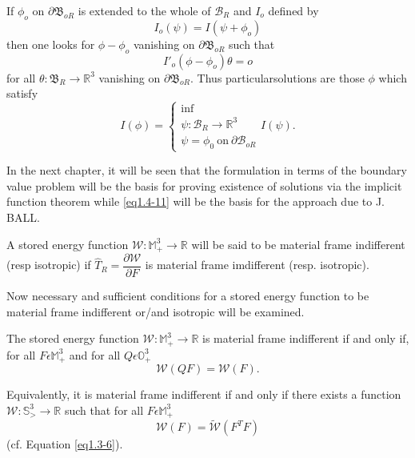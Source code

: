 If $\phi _o$ on $ \partial \mathfrak{B}_{oR} $ is extended to the
whole of $\mathcal {B}_R$ and $I_o$ defined by  
$$
I _o ( \psi ) = I ( \psi + \phi _o)
$$
then one looks for $\phi- \phi _o $ vanishing on $ \partial
\mathfrak{B}_{oR}$ such that  
$$
I'_o (\phi - \phi _o ) \theta =o
$$
for all $\theta : \mathfrak{B}_{R} \to \mathbb{R}^3$ vanishing on
$\partial \mathfrak{B} _{oR}$. Thus
particular\pageoriginale solutions are those $\phi$ which satisfy 
\begin{equation*}
  I (\phi )=
  \begin{cases}
    \inf\\
    \psi :\mathscr{B}_{R} \to \mathbb{R}^{3}\\
    \psi = \phi_{0} ~\text{on}~ \partial \mathscr{B}_{oR}
  \end{cases} I(\psi).
   \tag{1.4-11}\label{eq1.4-11}
\end{equation*}

In the next chapter, it will be seen that the formulation in terms of
the boundary value problem will be the basis for proving existence of
solutions via the implicit function theorem while \eqref{eq1.4-11} will be the
basis for the approach due to J. BALL. 

A stored energy function
$\mathcal{W} : \mathbb{M}^{3}_{+} \to 
\mathbb{R}$ will be said to be material frame indifferent (resp
isotropic) if $\hat{T}_{R} = \dfrac{\partial \mathcal{W}}{\partial F}$
is material frame imdifferent (resp. isotropic). 

Now necessary and sufficient conditions for a stored energy function
to be material frame indifferent or/and isotropic will be examined.  

\begin{theorem}\label{chap1-thm1.4.2} %
  The stored energy function $\mathcal{W} : \mathbb{M}^{3}_{+} \to
  \mathbb{R}$ is material frame indifferent if and only if, for all $F
  \epsilon \mathbb{M}^{3}_{+}$ and for all $Q \epsilon
  \mathbb{O}^{3}_{+}$ 
  \begin{equation*}
    \mathcal{W} (QF) = \mathcal{W}(F). \tag{1.4-12}\label{eq1.4-12}
  \end{equation*}

Equivalently, it is material frame indifferent if and only if there
exists a function $\mathcal{W} : \mathbb{S}^{3}_{>} \to \mathbb{R}$
such that for all $F \epsilon \mathbb{M}^{3}_{+}$ 
\begin{equation*}
\mathcal{W}(F) = \tilde{\mathcal{W}}(F^{T}F) \tag{1.4-13}\label{eq1.4-13}
\end{equation*}
(cf. Equation \eqref{eq1.3-6}).
\end{theorem}

